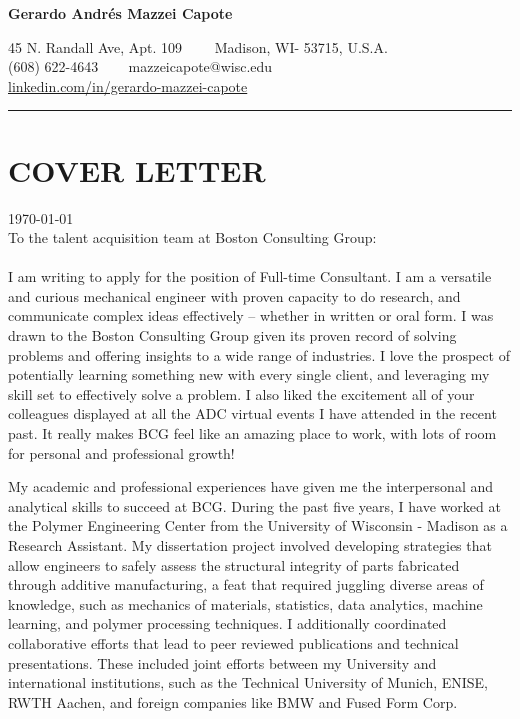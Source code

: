 \documentclass[12pt,letterpaper]{article}
\begin{document}
\begin{center}
	{\LARGE \textbf{Gerardo Andrés Mazzei Capote}}

	45 N. Randall Ave, Apt. 109\ \ \textbullet
	\ \ Madison, WI- 53715, U.S.A.
	\\
	(608) 622-4643 \ \textbullet
	\ \ mazzeicapote@wisc.edu\\
	\href{https://www.linkedin.com/in/gerardo-mazzei-capote}{linkedin.com/in/gerardo-mazzei-capote}
	
\end{center}
\vspace{-0.5em}
\hrule
\vspace{0.4em}
\vspace{-1em}

\section*{COVER LETTER}
\vspace{0.4em}
\today
\\
To the talent acquisition team at Boston Consulting Group:
\\
\\
\indent I am writing to apply for the position of Full-time Consultant. I am a versatile and curious mechanical engineer with proven capacity to do research, and communicate complex ideas effectively -- whether in written or oral form. I was drawn to the Boston Consulting Group given its proven record of solving problems and offering insights to a wide range of industries. I love the prospect of potentially learning something new with every single client, and leveraging my skill set to effectively solve a problem. I also liked the excitement all of your colleagues displayed at all the ADC virtual events I have attended in the recent past. It really makes BCG feel like an amazing place to work, with lots of room for personal and professional growth!

My academic and professional experiences have given me the interpersonal and analytical skills to succeed at BCG. During the past five years, I have worked at the Polymer Engineering Center from the University of Wisconsin - Madison as a Research Assistant. My dissertation project involved developing strategies that allow engineers to safely assess the structural integrity of parts fabricated through additive manufacturing, a feat that required juggling diverse areas of knowledge, such as mechanics of materials, statistics, data analytics, machine learning, and polymer processing techniques. I additionally coordinated collaborative efforts that lead to peer reviewed publications and technical presentations. These included joint efforts between my University and international institutions, such as the Technical University of Munich, ENISE, RWTH Aachen, and foreign companies like BMW and Fused Form Corp.
\end{document}

